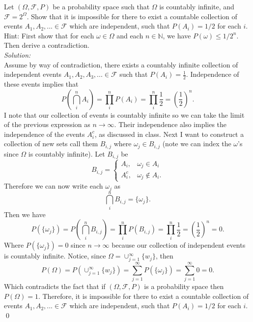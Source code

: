 \documentclass[10pt]{amsart}
\begin{document}
 Let $(\Omega, \mathcal{F},P)$ be a probability space such that $\Omega$ is countably infinite, and $\mathcal{F}=2^{\Omega}$. Show that it is impossible for there to exist a countable collection of events $A_1, A_2,... \in \mathcal{F}$ which are independent, such that $P(A_i)=1/2$ for each $i$. Hint: First show that for each $\omega \in \Omega$ and each $n\in \mathds{N}$, we have $P({\omega})\leq 1/2^n$. Then derive a contradiction. \\
\textit{Solution:} \\
Assume by way of contradiction, there exists a countably infinite collection of independent events $A_1, A_2, A_3, ... \in \mathcal F$ such that $P(A_i) = \frac 1 2$.
Independence of these events implies that
$$
P\left( \bigcap_i^n A_i\right) = \prod_i^n P(A_i) = \prod_i^n \frac 1 2 = \left(\frac 1 2\right)^n.
$$
I note that our collection of events is countably infinite so we can take the limit of the previous expression as $n\rightarrow\infty$.
Their independence also implies the independence of the events $A_i^c$, as discussed in class.
Next I want to construct a collection of new sets call them $B_{i,j}$ where $\omega_j \in B_{i,j}$ (note we can index the $\omega$'s since $\Omega$ is countably infinite).
Let $B_{i,j}$ be
$$
B_{i,j} = \begin{cases}
 	A_i, & \omega_j \in A_i \\
	A_i^c, & \omega_j \not \in A_i.
\end{cases}
$$
Therefore we can now write each $\omega_j$ as 
$$\bigcap_i^n B_{i,j} = \{\omega_j\}.$$
Then we have
$$ P(\{\omega_j\}) =  P\left( \bigcap_i^n B_{i,j} \right) = \prod_i^n P(B_{i,j}) = \prod_i^n \frac 1 2 = \left(\frac 1 2\right)^n = 0.$$
Where $P(\{ \omega_j \}) = 0$ since $n\rightarrow \infty$ because our collection of independent events is countably infinite.
Notice, since $\Omega = \cup_{j = 1}^{\infty} \{w_j\}$, then
$$
P(\Omega) = P(\cup_{j = 1}^{\infty} \{w_j\}) = \sum_{j = 1}^{\infty} P(\{ \omega_j\}) = \sum_{j = 1}^{\infty} 0 = 0.
$$
Which contradicts the fact that if $(\Omega, \mathcal{F},P)$ is a probability space then $P(\Omega) = 1$.
Therefore, it is impossible for there to exist a countable collection of events $A_1, A_2,... \in \mathcal{F}$ which are independent, such that $P(A_i)=1/2$ for each $i$.
\qed \\
\end{document}
